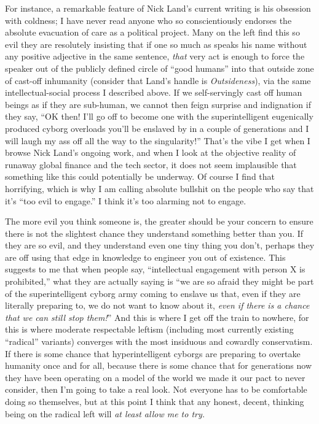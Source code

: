 \documentclass[a4paper,12pt,margin=.5in]{article}
\begin{document}
For instance, a remarkable feature of Nick Land's current writing is his
obsession with coldness; I have never read anyone who so conscientiously
endorses the absolute evacuation of care as a political project. Many on
the left find this so evil they are resolutely insisting that if one so
much as speaks his name without any positive adjective in the same
sentence, \emph{that} very act is enough to force the speaker out of the
publicly defined circle of ``good humans'' into that outside zone of
cast-off inhumanity (consider that Land's handle is \emph{Outsideness}),
via the same intellectual-social process I described above. If we
self-servingly cast off human beings as if they are sub-human, we cannot
then feign surprise and indignation if they say, ``OK then! I'll go off
to become one with the superintelligent eugenically produced cyborg
overloads you'll be enslaved by in a couple of generations and I will
laugh my ass off all the way to the singularity!'' That's the vibe I get
when I browse Nick Land's ongoing work, and when I look at the objective
reality of runaway global finance and the tech sector, it does not seem
implausible that something like this could potentially be underway. Of
course I find that horrifying, which is why I am calling absolute
bullshit on the people who say that it's ``too evil to engage.'' I think
it's too alarming not to engage.

The more evil you think someone is, the greater should be your concern
to ensure there is not the slightest chance they understand something
better than you. If they are so evil, and they understand even one tiny
thing you don't, perhaps they are off using that edge in knowledge to
engineer you out of existence. This suggests to me that when people say,
``intellectual engagement with person X is prohibited,'' what they are
actually saying is ``we are so afraid they might be part of the
superintelligent cyborg army coming to enslave us that, even if they are
literally preparing to, we do not want to know about it, \emph{even if
there is a chance that we can still stop them!}'' And this is where I
get off the train to nowhere, for this is where moderate respectable
leftism (including most currently existing ``radical'' variants)
converges with the most insiduous and cowardly conservatism. If there is
some chance that hyperintelligent cyborgs are preparing to overtake
humanity once and for all, because there is some chance that for
generations now they have been operating on a model of the world we made
it our pact to never consider, then I'm going to take a real look. Not
everyone has to be comfortable doing so themselves, but at this point I
think that any honest, decent, thinking being on the radical left will
\emph{at least allow me to try.}
\end{document}
